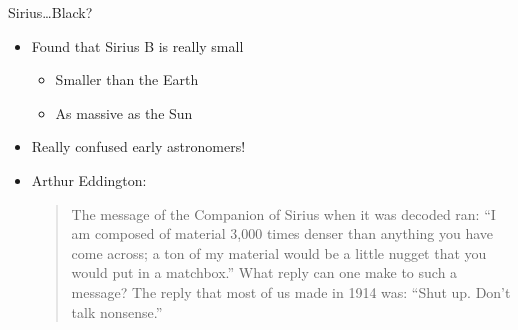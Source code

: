 \documentclass[pdf,aspectratio=169]{beamer}
\begin{document}
\begin{frame}{Sirius\ldots Black?}
  \begin{itemize}
	\item Found that Sirius B is \alert{really} small
	  \begin{itemize}
		\item Smaller than the Earth
		\item As massive as the Sun
	  \end{itemize}
	\item Really confused early astronomers!
	\item Arthur Eddington:
	  \begin{quote}
		The message of the Companion of Sirius when it was decoded ran: \alert{``I am composed of material 3,000 times denser than anything you have come across; a ton of my material would be a little nugget that you would put in a matchbox.''}
		What reply can one make to such a message? The reply that most of us made in 1914 was: \alert{``Shut up. Don't talk nonsense.''}
	  \end{quote}
  \end{itemize}
\end{frame}


\end{document}

